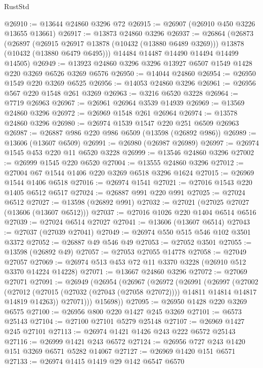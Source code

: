 \begin{lexlean}{RustStd}
\begin{coremodule}
@26910 := @13644 @24860 @3296 @72
@26915 := @26907 (@26910 @450 @3226 @13655 @13661)
@26917 := @13873 @24860 @3296
@26937 := @26864
    (@26873
      (@26897
        (@26915 @26917 @13878 (@10432 (@13880 @6489 @3269)))
        @13878
        (@10432 (@13880 @6479 @6495)))
      @14484
      @14487
      @14490
      @14494
      @14499
      @14505)
@26949 := @13923 @24860 @3296 @3296 @13927 @6507 @1549 @1428 @220 @3269 @6526 @3269 @6576
@26950 := @14044 @24860
@26954 := @26950 @1549 @220 @3269 @6525
@26956 := @14053 @24860 @3296
@26961 := @26956 @567 @220 @1548 @261 @3269
@26963 := @3216 @6520 @3228
@26964 := @7719 @26963
@26967 := @26961 @26964 @3539 @14939
@26969 := @13569 @24860 @3296
@26972 := @26969 @1548 @261 @26964
@26974 := @13578 @24860 @3296
@26980 := @26974 @1539 @1547 @220 @251 @6509 @26963
@26987 := @26887 @986 @220 @986 @6509 (@13598 (@26892 @986))
@26989 := @13606 (@13607 @6509)
@26991 := @26980 (@26987 @26989)
@26997 := @26974 @1545 @453 @220 @11 @6520 @3228
@26999 := @13546 @24860 @3296
@27002 := @26999 @1545 @220 @6520
@27004 := @13555 @24860 @3296
@27012 := @27004 @67 @1544 @1406 @220 @3269 @6518 @3296 @1624
@27015 := @26969 @1544 @1406 @6518
@27016 := @26974 @1541
@27021 := @27016 @1543 @220 @1405 @6512 @6517
@27024 := @26887 @991 @220 @991
@27025 := @27024 @6512
@27027 := @13598 (@26892 @991)
@27032 := @27021 (@27025 @27027 (@13606 (@13607 @6512)))
@27037 := @27016 @1026 @220 @1404 @6514 @6516
@27039 := @27024 @6514 @27027
@27041 := @13606 (@13607 @6514)
@27043 := @27037 (@27039 @27041)
@27049 := @26974 @550 @515 @546 @102 @3501 @3372
@27052 := @26887 @49 @546 @49
@27053 := @27052 @3501
@27055 := @13598 (@26892 @49)
@27057 := @27053 @27055 @14778
@27058 := @27049 @27057
@27069 := @26974 @513 @453 @72 @11 @3370 @3228 (@26910 @512 @3370 @14224 @14228)
@27071 := @13667 @24860 @3296
@27072 := @27069 @27071
@27091 := @26949
    (@26954
      (@26967
        (@26972
          (@26991
            (@26997
              (@27002
                (@27012
                  (@27015 (@27032 (@27043 (@27058 @27072))))
                  @14811
                  @14814
                  @14817
                  @14819
                  @14263))
              @27071)))
        @15698))
@27095 := @26950 @1428 @220 @3269 @6575
@27100 := @26956 @800 @220 @1427 @245 @3269
@27101 := @6573 @25143
@27104 := @27100 @27101 @5279 @25148
@27107 := @26969 @1427 @245 @27101
@27113 := @26974 @1421 @1426 @243 @222 @6572 @25143
@27116 := @26999 @1421 @243 @6572
@27124 := @26956 @727 @243 @1420 @151 @3269 @6571 @5282 @14067
@27127 := @26969 @1420 @151 @6571
@27133 := @26974 @1415 @1419 @29 @142 @6547 @6570

\end{coremodule}
\end{lexlean}
